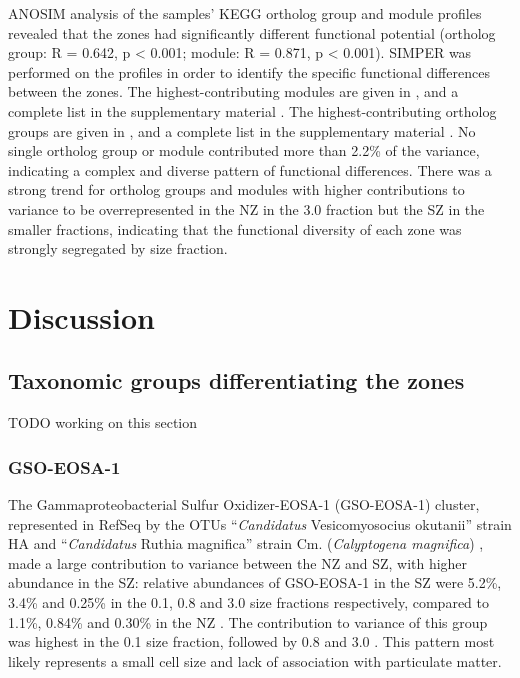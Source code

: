 \ac{ANOSIM} analysis of the samples' \ac{KEGG} ortholog group and module profiles revealed that the zones had significantly different functional potential (ortholog group: R = 0.642, p < 0.001; module: R = 0.871, p < 0.001). 
\ac{SIMPER} was performed on the profiles in order to identify the specific functional differences between the zones. 
The highest-contributing modules are given in , and a complete list in the supplementary material .
The highest-contributing ortholog groups are given in , and a complete list in the supplementary material .
No single ortholog group or module contributed more than 2.2\% of the variance, indicating a complex and diverse pattern of functional differences. 
There was a strong trend for ortholog groups and modules with higher contributions to variance to be overrepresented in the \ac{NZ} in the 3.0 \micron{} fraction but the \ac{SZ} in the smaller fractions, indicating that the functional diversity of each zone was strongly segregated by size fraction.




\section{Discussion}

\subsection{Taxonomic groups differentiating the zones}
TODO working on this section

\subsubsection{GSO-EOSA-1}

The Gammaproteobacterial Sulfur Oxidizer-EOSA-1 (GSO-EOSA-1) cluster, represented in RefSeq by the \acp{OTU} ``\emph{Candidatus} Vesicomyosocius okutanii'' strain HA and ``\emph{Candidatus} Ruthia magnifica'' strain Cm. (\emph{Calyptogena magnifica}) \cite{Walsh:2009fja}, made a large contribution to variance between the \ac{NZ} and \ac{SZ}, with higher abundance in the \ac{SZ}: relative abundances of GSO-EOSA-1 in the \ac{SZ} were 5.2\%, 3.4\% and 0.25\% in the 0.1, 0.8 and 3.0 \micron{} size fractions respectively, compared to 1.1\%, 0.84\% and 0.30\% in the \ac{NZ} .
The contribution to variance of this group was highest in the 0.1 \micron{} size fraction, followed by 0.8 \micron{} and 3.0 \micron{} .
This pattern most likely represents a small cell size and lack of association with particulate matter.


